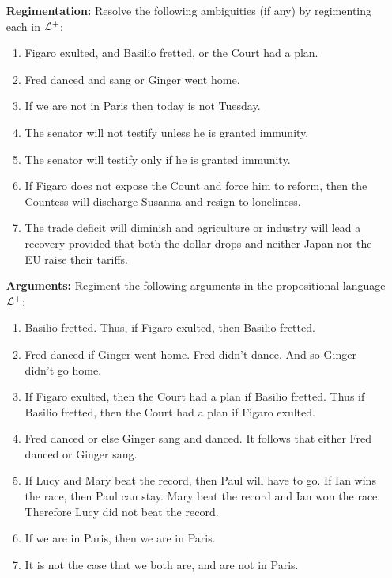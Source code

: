 \documentclass[a4paper, 11pt]{article} %
\begin{document}
\begin{enumerate}[leftmargin=1.2in,itemsep=2pt]\small
	\item[\bf Regimentation:] Resolve the following ambiguities (if any) by regimenting each in $\mathcal{L}^+$:
	      \begin{enumerate}[label=\arabic*.]\small
		      \item Figaro exulted, and Basilio fretted, or the Court had a plan.
		      \item Fred danced and sang or Ginger went home.
		      \item If we are not in Paris then today is not Tuesday.
		      \item The senator will not testify unless he is granted immunity.
		      \item The senator will testify only if he is granted immunity.
		      \item If Figaro does not expose the Count and force him to reform, then the Countess will discharge Susanna and resign to loneliness.
		      \item The trade deficit will diminish and agriculture or industry will lead a recovery provided that both the dollar drops and neither Japan nor the EU raise their tariffs.
	      \end{enumerate}
	\item[\bf Arguments:] Regiment the following arguments in the propositional language $\mathcal{L}^+$:
	      \begin{enumerate}[label=\arabic*.]\small
		      \item Basilio fretted. Thus, if Figaro exulted, then Basilio fretted.
		      \item Fred danced if Ginger went home. Fred didn't dance. And so Ginger didn't go home.
		      \item If Figaro exulted, then the Court had a plan if Basilio fretted. Thus if Basilio fretted, then the Court had a plan if Figaro exulted.
		      \item Fred danced or else Ginger sang and danced. It follows that either Fred danced or Ginger sang.
		      \item If Lucy and Mary beat the record, then Paul will have to go. If Ian wins the race, then Paul can stay. Mary beat the record and Ian won the race. Therefore Lucy did not beat the record.
		      \item If we are in Paris, then we are in Paris.
		      \item It is not the case that we both are, and are not in Paris.

\end{enumerate}
\end{enumerate}
\end{document}
